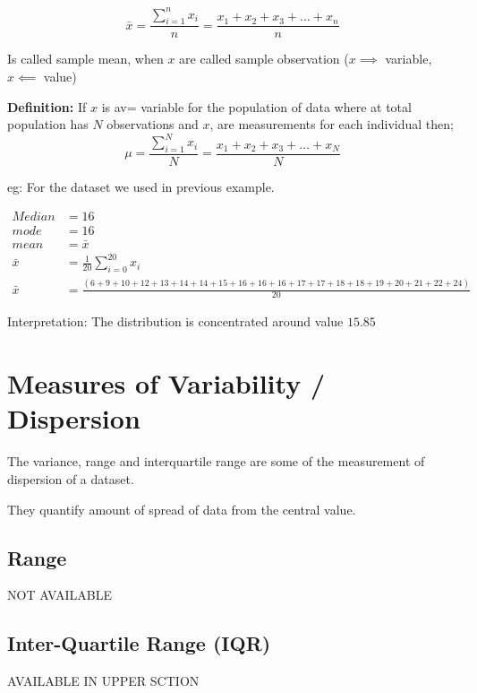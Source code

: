\documentclass[12pt]{article}
\begin{document}
\begin{equation}
    \bar{x} = \frac{\sum_{i = 1}^{n} x_i}{n}= \frac{x_1 + x_2 + x_3 + \ldots + x_n}{n}
\end{equation}

Is called sample mean, when $x$ are called sample observation ($x \implies$ variable, $x \impliedby$ value)

\textbf{Definition: }If $x$ is av= variable for the population of data where at total population has $N$ observations and $x$, are measurements for each individual then;
\begin{equation}
    \mu = \frac{\sum_{i = 1}^{N} x_i}{N}= \frac{x_1 + x_2 + x_3 + \ldots + x_N}{N}
\end{equation}

eg: For the dataset we used in previous example.

\begin{align*}
    Median  & = 16                                                                                                        \\
    mode    & = 16                                                                                                        \\
    mean    & = \bar{x}                                                                                                   \\
    \bar{x} & = \frac{1}{20}\sum_{i = 0}^{20} x_i                                                                         \\
    \bar{x} & = \frac{(6 + 9 + 10 + 12 +13 + 14 + 14 +15 + 16 +16 + 16 + 17 + 17 + 18 + 18 + 19 + 20 + 21 + 22 + 24)}{20}
\end{align*}


Interpretation: The distribution is concentrated around value $15.85$

\newpage

\section{Measures of Variability / Dispersion}
The variance, range and interquartile range are some of the measurement of dispersion of a dataset.

They quantify amount of spread of data from the central value.
\subsection{Range}
NOT AVAILABLE
\subsection{Inter-Quartile Range (IQR)}
AVAILABLE IN UPPER SCTION
\end{document}
